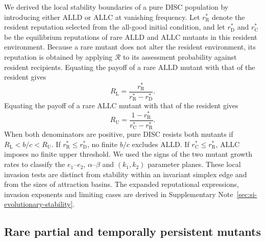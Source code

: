 \documentclass[fleqn,10pt]{wlscirep}
\begin{document}
We derived the local stability boundaries of a pure $\mathrm{DISC}$ population by introducing either $\mathrm{ALLD}$ or $\mathrm{ALLC}$ at vanishing frequency. Let $r_{\mathrm R}^{*}$ denote the resident reputation selected from the all-good initial condition, and let $r_{\mathrm D}^{*}$ and $r_{\mathrm C}^{*}$ be the equilibrium reputations of rare $\mathrm{ALLD}$ and $\mathrm{ALLC}$ mutants in this resident environment. Because a rare mutant does not alter the resident environment, its reputation is obtained by applying $\mathcal R$ to its assessment probability against resident recipients. Equating the payoff of a rare $\mathrm{ALLD}$ mutant with that of the resident gives
\begin{equation}
R_{\mathrm L}=\frac{r_{\mathrm R}^{*}}{r_{\mathrm R}^{*}-r_{\mathrm D}^{*}}.
\label{eq:methods-lower-benefit-cost-threshold}
\end{equation}
Equating the payoff of a rare $\mathrm{ALLC}$ mutant with that of the resident gives
\begin{equation}
R_{\mathrm U}=\frac{1-r_{\mathrm R}^{*}}{r_{\mathrm C}^{*}-r_{\mathrm R}^{*}}.
\label{eq:methods-upper-benefit-cost-threshold}
\end{equation}
When both denominators are positive, pure $\mathrm{DISC}$ resists both mutants if $R_{\mathrm L}<b/c<R_{\mathrm U}$. If $r_{\mathrm R}^{*}\leq r_{\mathrm D}^{*}$, no finite $b/c$ excludes $\mathrm{ALLD}$. If $r_{\mathrm C}^{*}\leq r_{\mathrm R}^{*}$, $\mathrm{ALLC}$ imposes no finite upper threshold. We used the signs of the two mutant growth rates to classify the $e_1$--$e_2$, $\alpha$--$\beta$ and $(k_1,k_2)$ parameter planes. These local invasion tests are distinct from stability within an invariant simplex edge and from the sizes of attraction basins. The expanded reputational expressions, invasion exponents and limiting cases are derived in Supplementary Note~\ref{sec:si-evolutionary-stability}.

\subsection*{Rare partial and temporally persistent mutants}
\label{sec:methods-opportunism}
\end{document}
